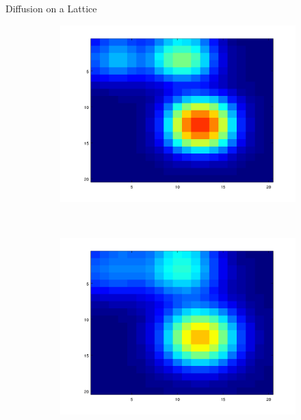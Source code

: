 \documentclass{beamer}
\begin{document}
\begin{frame}{Diffusion on a Lattice}
\begin{figure}[!h]
\begin{subfigure}[b]{0.25\textwidth}
    	\includegraphics[width=\textwidth]{images/anim_50.png}
    \end{subfigure}~
    \begin{subfigure}[b]{0.25\textwidth}
    	\includegraphics[width= \textwidth]{images/anim_80.png}
    \end{subfigure}~
    \begin{subfigure}[b]{0.25\textwidth}

\end{subfigure}
\end{figure}
\end{frame}
\end{document}
